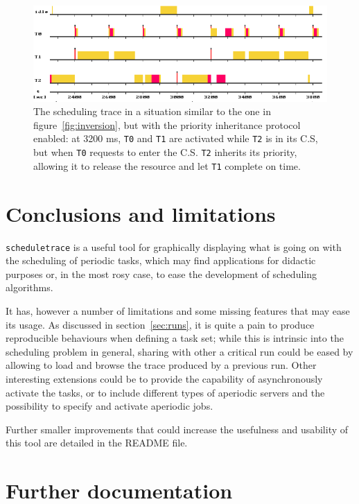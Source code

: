 \documentclass[paper=a4, fontsize=11pt]{scrartcl}
\newcommand{\mono}[1]{\texttt{#1}}
\numberwithin{equation}{section}        %
\numberwithin{figure}{section}          %
\numberwithin{table}{section}               %
\numberwithin{fragment}{section}
\begin{document}
\begin{figure}
  \centering
  \includegraphics[width=1\textwidth]{img/noinversion_inherit.png}
  \caption{\label{fig:noinversion-inherit} The scheduling trace in a situation similar to the one in figure~\ref{fig:inversion}, but with the priority inheritance protocol enabled: at 3200 ms, \mono{T0} and \mono{T1} are activated while \mono{T2} is in its C.S, but when \mono{T0} requests to enter the C.S. \mono{T2} inherits its priority, allowing it to release the resource and let \mono{T1} complete on time.}
\end{figure}


\section{Conclusions and limitations}
\mono{scheduletrace} is a useful tool for graphically displaying what is going on with the scheduling of periodic tasks, which may find applications for didactic purposes or, in the most rosy case, to ease the development of scheduling algorithms.

It has, however a number of limitations and some missing features that may ease its usage. As discussed in section~\ref{sec:runs}, it is quite a pain to produce reproducible behaviours when defining a task set; while this is intrinsic into the scheduling problem in general, sharing with other a critical run could be eased by allowing to load and browse the trace produced by a previous run. Other interesting extensions could be to provide the capability of asynchronously activate the tasks, or to include different types of aperiodic servers and the possibility to specify and activate aperiodic jobs.

Further smaller improvements that could increase the usefulness and usability of this tool are detailed in the README file.


\section*{Further documentation}
\label{sec:docs}
\end{document}
